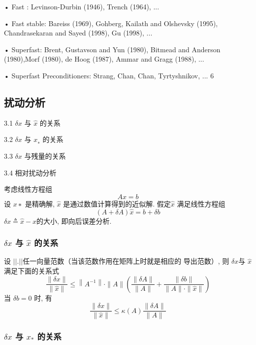 \documentclass[12pt,a4paper]{article}
\begin{document}
• Fast : Levinson-Durbin (1946), Trench (1964), ...

• Fast stable: Bareiss (1969), Gohberg, Kailath and Olshevsky (1995), Chandrasekaran and Sayed (1998), Gu (1998), ...

• Superfast: Brent, Gustavson and Yun (1980), Bitmead and Anderson (1980),Morf (1980), de Hoog (1987), Ammar and Gragg (1988), ...

• Superfast Preconditioners: Strang, Chan, Chan, Tyrtyshnikov, ...
6


\subsection{扰动分析}

3.1 $δx$ 与 $\hat{x}$ 的关系

3.2 $δx$ 与 $x_∗$ 的关系

3.3 $δx$ 与残量的关系

3.4 相对扰动分析


考虑线性方程组
\begin{equation}
A x=b
\end{equation}
设 $x∗$ 是精确解, $\hat{x}$ 是通过数值计算得到的近似解. 假定$ \hat{x}$ 满足线性方程组
\begin{equation}
(A+\delta A) \hat{x}=b+\delta b
\end{equation}
$\delta x \triangleq \hat{x}-x$的大小, 即向后误差分析.

\subsubsection{$δx$ 与 $\hat{x}$ 的关系}

\begin{theorem}
	设 $||.||$任一向量范数（当该范数作用在矩阵上时就是相应的
	导出范数）, 则 $δx $与 $\hat{x}$ 满足下面的关系式
	\begin{equation}
	\frac{\|\delta x\|}{\|\hat{x}\|} \leq\left\|A^{-1}\right\| \cdot\|A\|\left(\frac{\|\delta A\|}{\|A\|}+\frac{\|\delta b\|}{\|A\| \cdot\|\hat{x}\|}\right)
	\end{equation}
	当 $δb = 0$ 时, 有
	\begin{equation}
	\frac{\|\delta x\|}{\|\hat{x}\|} \leq \kappa(A) \frac{\|\delta A\|}{\|A\|}
	\end{equation}
\end{theorem}


\subsubsection{$δx$ 与 $x_{*}$ 的关系}
\end{document}

